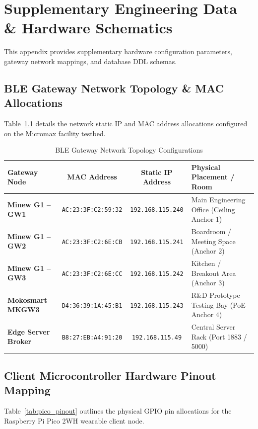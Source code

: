 \chapter{Supplementary Engineering Data \& Hardware Schematics}
\label{app:data}

This appendix provides supplementary hardware configuration parameters, gateway network mappings, and database DDL schemas.

\section{BLE Gateway Network Topology \& MAC Allocations}
Table~\ref{tab:gateway_network_config} details the network static IP and MAC address allocations configured on the Micromax facility testbed.

\begin{table}[htbp]
    \centering
    \caption{BLE Gateway Network Topology Configurations}
    \label{tab:gateway_network_config}
    \begin{tabularx}{\textwidth}{l c c X}
        \toprule
        \textbf{Gateway Node} & \textbf{MAC Address} & \textbf{Static IP Address} & \textbf{Physical Placement / Room} \\
        \midrule
        \textbf{Minew G1 -- GW1} & \texttt{AC:23:3F:C2:59:32} & \texttt{192.168.115.240} & Main Engineering Office (Ceiling Anchor 1) \\
        \textbf{Minew G1 -- GW2} & \texttt{AC:23:3F:C2:6E:CB} & \texttt{192.168.115.241} & Boardroom / Meeting Space (Anchor 2) \\
        \textbf{Minew G1 -- GW3} & \texttt{AC:23:3F:C2:6E:CC} & \texttt{192.168.115.242} & Kitchen / Breakout Area (Anchor 3) \\
        \textbf{Mokosmart MKGW3} & \texttt{D4:36:39:1A:45:B1} & \texttt{192.168.115.243} & R\&D Prototype Testing Bay (PoE Anchor 4) \\
        \textbf{Edge Server Broker}& \texttt{B8:27:EB:A4:91:20} & \texttt{192.168.115.49} & Central Server Rack (Port 1883 / 5000) \\
        \bottomrule
    \end{tabularx}
\end{table}

\section{Client Microcontroller Hardware Pinout Mapping}
Table~\ref{tab:pico_pinout} outlines the physical GPIO pin allocations for the Raspberry Pi Pico 2WH wearable client node.

